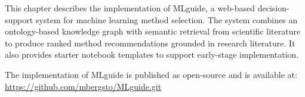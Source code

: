 
This chapter describes the implementation of MLguide, a web-based 
decision-support system for machine learning method selection. The 
system combines an ontology-based knowledge graph with semantic 
retrieval from scientific literature to produce ranked method 
recommendations grounded in research literature. It also provides 
starter notebook templates to support early-stage implementation.

\begin{tcolorbox}[colback=gray!5,colframe=gray!60]
The implementation of MLguide is published as open-source and is available at:
\url{https://github.com/mbergsto/MLguide.git}
\end{tcolorbox}












